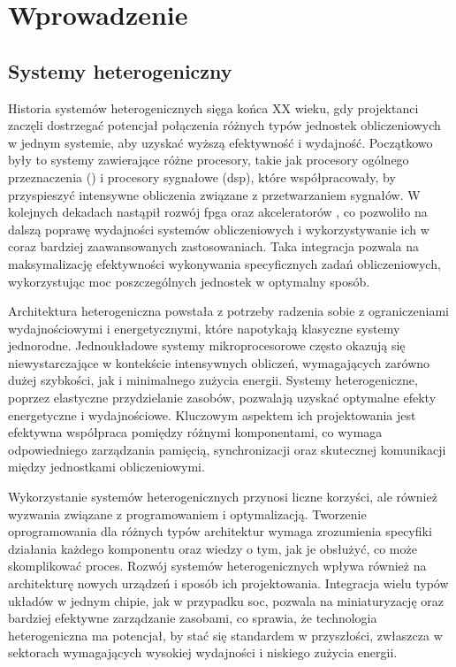 \chapter{Wprowadzenie}
\label{cha:wprowadzenie}

\section{Systemy heterogeniczny}
\label{sec:system-heterogeniczny}

Historia systemów heterogenicznych sięga końca XX wieku, gdy projektanci zaczęli dostrzegać potencjał połączenia różnych typów jednostek obliczeniowych w jednym systemie, aby uzyskać wyższą efektywność i wydajność. Początkowo były to systemy zawierające różne procesory, takie jak procesory ogólnego przeznaczenia () i procesory sygnałowe (\ac{dsp}), które współpracowały, by przyspieszyć intensywne obliczenia związane z przetwarzaniem sygnałów. W kolejnych dekadach nastąpił rozwój \ac{fpga} oraz akceleratorów , co pozwoliło na dalszą poprawę wydajności systemów obliczeniowych i wykorzystywanie ich w coraz bardziej zaawansowanych zastosowaniach. Taka integracja pozwala na maksymalizację efektywności wykonywania specyficznych zadań obliczeniowych, wykorzystując moc poszczególnych jednostek w optymalny sposób.

Architektura heterogeniczna powstała z potrzeby radzenia sobie z ograniczeniami wydajnościowymi i energetycznymi, które napotykają klasyczne systemy jednorodne. Jednoukładowe systemy mikroprocesorowe często okazują się niewystarczające w kontekście intensywnych obliczeń, wymagających zarówno dużej szybkości, jak i minimalnego zużycia energii. Systemy heterogeniczne, poprzez elastyczne przydzielanie zasobów, pozwalają uzyskać optymalne efekty energetyczne i wydajnościowe. Kluczowym aspektem ich projektowania jest efektywna współpraca pomiędzy różnymi komponentami, co wymaga odpowiedniego zarządzania pamięcią, synchronizacji oraz skutecznej komunikacji między jednostkami obliczeniowymi.

Wykorzystanie systemów heterogenicznych przynosi liczne korzyści, ale również wyzwania związane z programowaniem i optymalizacją. Tworzenie oprogramowania dla różnych typów architektur wymaga zrozumienia specyfiki działania każdego komponentu oraz wiedzy o tym, jak je obsłużyć, co może skomplikować proces. Rozwój systemów heterogenicznych wpływa również na architekturę nowych urządzeń i sposób ich projektowania. Integracja wielu typów układów w jednym chipie, jak w przypadku \ac{soc}, pozwala na miniaturyzację oraz bardziej efektywne zarządzanie zasobami, co sprawia, że technologia heterogeniczna ma potencjał, by stać się standardem w przyszłości, zwłaszcza w sektorach wymagających wysokiej wydajności i niskiego zużycia energii.

